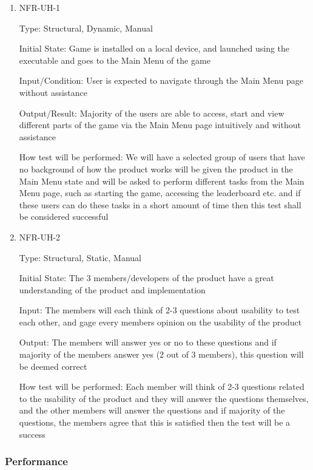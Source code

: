 \documentclass[12pt, titlepage]{article}
\begin{document}
\begin{enumerate}
\item{ NFR-UH-1\\}

Type: Structural, Dynamic, Manual

Initial State: Game is installed on a local device, and launched using the executable and goes to the Main Menu of the game

Input/Condition: User is expected to navigate through the Main Menu page without assistance

Output/Result: Majority of the users are able to access, start and view different parts of the game via the Main Menu page intuitively and without assistance

How test will be performed: We will have a selected group of users that have no background of how the product works will be given the product in the Main Menu state and will be asked to perform different tasks from the Main Menu page, such as starting the game, accessing the leaderboard etc. and if these users can do these tasks in a short amount of time then this test shall be considered successful

\item{ NFR-UH-2\\}

Type: Structural, Static, Manual

Initial State: The 3 members/developers of the product have a great understanding of the product and implementation

Input: The members will each think of 2-3 questions about usability to test each other, and gage every members opinion on the usability of the product

Output: The members will answer yes or no to these questions and if majority of the members answer yes (2 out of 3 members), this question will be deemed correct

How test will be performed: Each member will think of 2-3 questions related to the usability of the product and they will answer the questions themselves, and the other members will answer the questions and if majority of the questions, the members agree that this is satisfied then the test will be a success
\end{enumerate}

\subsubsection{Performance}
\end{document}
